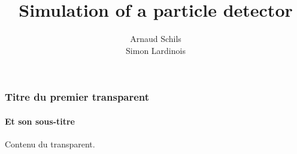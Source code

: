 \documentclass{beamer}
\begin{document}
\title{Simulation of a particle detector}
\author{Arnaud Schils \\ Simon Lardinois}
\maketitle

\begin{frame} %
\frametitle{Titre du premier transparent}
\framesubtitle{Et son sous-titre}

Contenu du transparent.

\end{frame}

\begin{frame} %

\end{frame}
\end{document}

